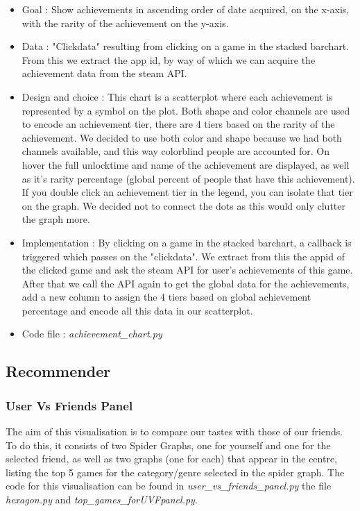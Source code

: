 \documentclass{article}
\begin{document}
    \begin{itemize}
        \item Goal : Show achievements in ascending order of date acquired, on the x-axis, with the rarity of the achievement on the y-axis.
        \item Data : "Clickdata" resulting from clicking on a game in the stacked barchart. From this we extract the app id, by way of which we can acquire the achievement data from the steam API.
        \item Design and choice : This chart is a scatterplot where each achievement is represented by a symbol on the plot. Both shape and color channels are used to encode an achievement tier, there are 4 tiers based on the rarity of the achievement. We decided to use both color and shape because we had both channels available, and this way colorblind people are accounted for. On hover the full unlocktime and name of the achievement are displayed, as well as it's rarity percentage (global percent of people that have this achievement). If you double click an achievement tier in the legend, you can isolate that tier on the graph. We decided not to connect the dots as this would only clutter the graph more.
        \item Implementation : By clicking on a game in the stacked barchart, a callback is triggered which passes on the "clickdata". We extract from this the appid of the clicked game and ask the steam API for user's achievements of this game. After that we call the API again to get the global data for the achievements, add a new column to assign the 4 tiers based on global achievement percentage and encode all this data in our scatterplot.
        \item Code file : \textit{achievement\_chart.py}
    \end{itemize}
    
	\subsection{Recommender}
    
	\subsubsection{User Vs Friends Panel}
	
	The aim of this visualisation is to compare our tastes with those of our friends. To do this, it consists of two Spider Graphs, one for yourself and one for the selected friend, as well as two graphs (one for each) that appear in the centre, listing the top 5 games for the category/genre selected in the spider graph. The code for this visualisation can be found in \textit{user\_vs\_friends\_panel.py} the file \textit{hexagon.py} and \textit{top\_games\_forUVFpanel.py}.
\end{document}
